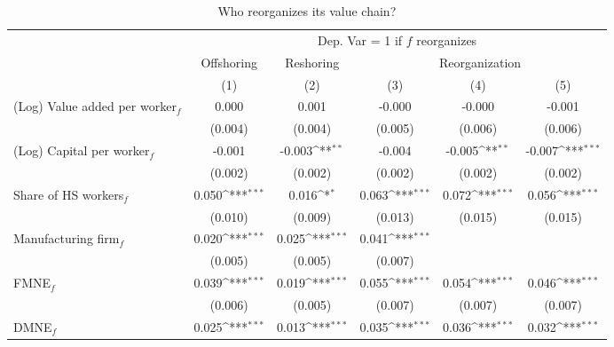 \begin{table}[htbp] \footnotesize \centering
\def\sym#1{\ifmmode^{#1}\else\(^{#1}\)\fi}
\caption{Who reorganizes its value chain? \label{tab:reg_who_paper}}
\renewcommand{\arraystretch}{1}
\begin{tabular}{l*{5}{c}}
\toprule
&\multicolumn{5}{c}{Dep. Var = 1 if $ f $ reorganizes} \\
\cmidrule(lr){2-6}
                &\multicolumn{1}{c}{Offshoring}&\multicolumn{1}{c}{Reshoring}&\multicolumn{3}{c}{Reorganization}                      \\\cmidrule(lr){2-2}\cmidrule(lr){3-3}\cmidrule(lr){4-6}
                &\multicolumn{1}{c}{(1)}         &\multicolumn{1}{c}{(2)}         &\multicolumn{1}{c}{(3)}         &\multicolumn{1}{c}{(4)}         &\multicolumn{1}{c}{(5)}         \\
\midrule
(Log) Value added per worker$ _f$&    0.000         &    0.001         &   -0.000         &   -0.000         &   -0.001         \\
                &  (0.004)         &  (0.004)         &  (0.005)         &  (0.006)         &  (0.006)         \\
\addlinespace
(Log) Capital per worker$ _f$&   -0.001         &   -0.003\sym{**} &   -0.004         &   -0.005\sym{**} &   -0.007\sym{***}\\
                &  (0.002)         &  (0.002)         &  (0.002)         &  (0.002)         &  (0.002)         \\
\addlinespace
Share of HS workers$ _f$&    0.050\sym{***}&    0.016\sym{*}  &    0.063\sym{***}&    0.072\sym{***}&    0.056\sym{***}\\
                &  (0.010)         &  (0.009)         &  (0.013)         &  (0.015)         &  (0.015)         \\
\addlinespace
Manufacturing firm$ _f$&    0.020\sym{***}&    0.025\sym{***}&    0.041\sym{***}&                  &                  \\
                &  (0.005)         &  (0.005)         &  (0.007)         &                  &                  \\
\addlinespace
FMNE$ _f$       &    0.039\sym{***}&    0.019\sym{***}&    0.055\sym{***}&    0.054\sym{***}&    0.046\sym{***}\\
                &  (0.006)         &  (0.005)         &  (0.007)         &  (0.007)         &  (0.007)         \\
\addlinespace
DMNE$ _f$       &    0.025\sym{***}&    0.013\sym{***}&    0.035\sym{***}&    0.036\sym{***}&    0.032\sym{***}\\

\end{tabular}
\end{table}
